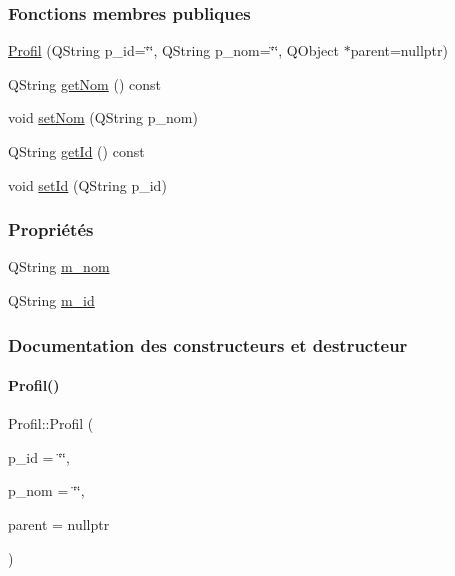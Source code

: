 \subsubsection*{Fonctions membres publiques}
\begin{DoxyCompactItemize}
\item 
\hyperlink{class_profil_a39dd2cc6a9548a055892dd7fcf72a2fd}{Profil} (Q\+String p\+\_\+id=\char`\"{}\char`\"{}, Q\+String p\+\_\+nom=\char`\"{}\char`\"{}, Q\+Object $\ast$parent=nullptr)
\item 
Q\+String \hyperlink{class_profil_aac46cc403319711f8ed5aef3fc1d0011}{get\+Nom} () const
\item 
void \hyperlink{class_profil_a020bcb3d28350b10c58f86ab093719cd}{set\+Nom} (Q\+String p\+\_\+nom)
\item 
Q\+String \hyperlink{class_profil_ab6281942d5ebe10cb3b38589fc353ff6}{get\+Id} () const
\item 
void \hyperlink{class_profil_a1b8f1741f5a201f50f6f8d6cb274c5c0}{set\+Id} (Q\+String p\+\_\+id)
\end{DoxyCompactItemize}
\subsubsection*{Propriétés}
\begin{DoxyCompactItemize}
\item 
Q\+String \hyperlink{class_profil_a5159c0fa27b964d20813a51a56cab0dc}{m\+\_\+nom}
\item 
Q\+String \hyperlink{class_profil_a181301ab1db188efb1e7c1574f6be917}{m\+\_\+id}
\end{DoxyCompactItemize}


\subsubsection{Documentation des constructeurs et destructeur}
\mbox{\label{class_profil_a39dd2cc6a9548a055892dd7fcf72a2fd}} 
\paragraph{\texorpdfstring{Profil()}{Profil()}}
{\footnotesize\ttfamily Profil\+::\+Profil (\begin{DoxyParamCaption}\item[{Q\+String}]{p\+\_\+id = {\ttfamily \char`\"{}\char`\"{}},  }\item[{Q\+String}]{p\+\_\+nom = {\ttfamily \char`\"{}\char`\"{}},  }\item[{Q\+Object $\ast$}]{parent = {\ttfamily nullptr} }\end{DoxyParamCaption})\hspace{0.3cm}{\ttfamily [explicit]}}


